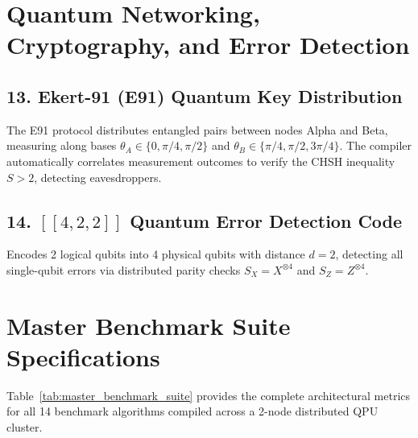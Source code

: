 \section{Quantum Networking, Cryptography, and Error Detection}
\label{sec:networking_benchmarks}

\subsection{13. Ekert-91 (E91) Quantum Key Distribution}
The E91 protocol distributes entangled pairs between nodes Alpha and Beta, measuring along bases $\theta_A \in \{0, \pi/4, \pi/2\}$ and $\theta_B \in \{\pi/4, \pi/2, 3\pi/4\}$. The compiler automatically correlates measurement outcomes to verify the CHSH inequality $S > 2$, detecting eavesdroppers.

\subsection{14. $[[4, 2, 2]]$ Quantum Error Detection Code}
Encodes 2 logical qubits into 4 physical qubits with distance $d = 2$, detecting all single-qubit errors via distributed parity checks $S_X = X^{\otimes 4}$ and $S_Z = Z^{\otimes 4}$.

\section{Master Benchmark Suite Specifications}
\label{sec:master_benchmark_table}

Table~\ref{tab:master_benchmark_suite} provides the complete architectural metrics for all 14 benchmark algorithms compiled across a 2-node distributed QPU cluster.

